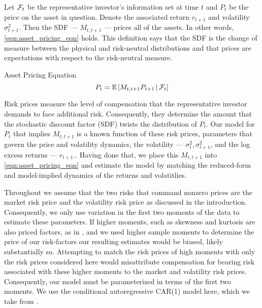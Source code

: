 \documentclass[11pt, letterpaper, twoside]{article}
\begin{document}
Let $\mathcal{F}_t$ be the representative investor's information set at time $t$ and $P_t$ be the price on the asset in question. Denote the associated return $r_{t+1}$ and volatility $\sigma^2_{t+1}$. Then the SDF --- $M_{t,t+1}$ --- prices all of the assets. In other words, \cref{eqn:asset_pricing_eqn}  holds. This definition says that the SDF is the change of measure between the physical and risk-neutral distributions and that prices are expectations with respect to the risk-neutral measure.

\begin{defn}{Asset Pricing Equation}
    \label{eqn:asset_pricing_eqn}
    \begin{equation}
        P_t = \operatorname{\mathbb{E}}\left[M_{t,t+1} P_{t+1} \,\middle\vert\, \mathcal{F}_t \right] 
    \end{equation}
\end{defn}

Risk prices measure the level of compensation that the representative investor demands to face additional risk. Consequently, they determine the amount that the stochastic discount factor (SDF) twists the distribution of $P_t$.  Our model for $P_t$ that implies $M_{t,t+1}$ is a known function of these risk prices, parameters that govern the price and volatility dynamics, the volatility --- $\sigma^2_{t}, \sigma^2_{t+1}$, and the log excess returns --- $r_{t+1}$.. Having done that, we place this $M_{t,t+1}$ into \cref{eqn:asset_pricing_eqn} and estimate the model by matching the reduced-form and model-implied dynamics of the returns and volatitlies.

Throughout we assume that the two risks that command nonzero prices are the market risk price and the volatility risk price as discussed in the introduction. Consequently, we  only use variation in the first two moments of the data to estimate these parameters. If higher moments, such as skewness and kurtosis are also priced factors, as in \textcites{harvey2000conditional, conrad2012exante, chang2013market}, and we used higher sample moments to determine the price of our risk-factors our resulting estimates would be biased, likely substantially so.  Attempting to match the risk prices of high moments with only the risk prices considered here would misattribute compensation for bearing risk associated with these higher moments to the market and volatility risk prices.  Consequently, our model must be parameterized in terms of the first two moments. We use the conditional autoregressive CAR(1) model here, which we take from \textcite{darolles2006structural,han2018leverage}. 
\end{document}
